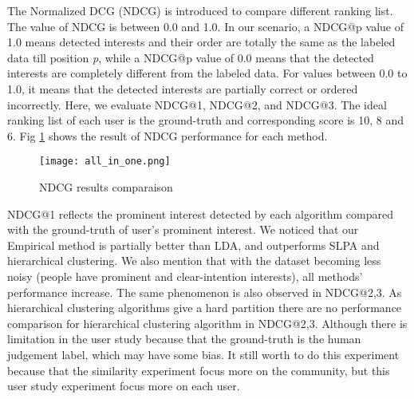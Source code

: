 The Normalized DCG (NDCG) is introduced to compare different ranking list. The value of NDCG is between 0.0 and 1.0. In our scenario, a NDCG@p value of 1.0 means detected interests and their order are totally the same as the labeled data till position \textit{p}, while a NDCG@p value of 0.0 means that the detected interests are completely different from the labeled data. For values between 0.0 to 1.0, it means that the detected interests are partially correct or ordered incorrectly. %
Here, we evaluate NDCG@1, NDCG@2, and NDCG@3. The ideal ranking list of each user is the ground-truth and corresponding score is 10, 8 and 6. Fig \ref{fig:allinone} shows the result of NDCG performance for each method. 
\begin{figure}[hp]
\centering
\texttt{[image: all\_in\_one.png]} 
\caption{NDCG results comparaison}
\label{fig:allinone} %
\end{figure}
NDCG@1 reflects the prominent interest detected by each algorithm compared with the ground-truth of user's prominent interest. We noticed that our Empirical method is partially better than LDA, and outperforms SLPA and hierarchical clustering. We also mention that with the dataset becoming less noisy (people have prominent and clear-intention interests), all methods' performance increase. The same phenomenon is also observed in NDCG@2,3. As hierarchical clustering algorithms give a hard partition there are no performance comparison for hierarchical clustering algorithm in NDCG@2,3. Although there is limitation in the user study because that the ground-truth is the human judgement label, which may have some bias. It still worth to do this experiment because that the similarity experiment focus more on the community, but this user study experiment focus more on each user.


